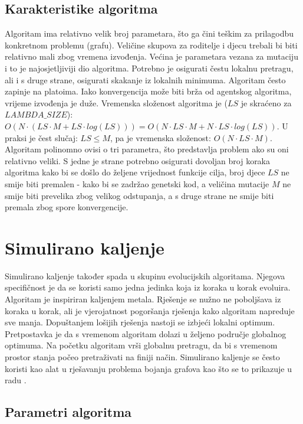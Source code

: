 \documentclass[times, utf8, diplomski, numeric]{fer}
\begin{document}
\subsection{Karakteristike algoritma}

Algoritam ima relativno velik broj parametara, što ga čini teškim za prilagodbu konkretnom problemu (grafu). Veličine skupova za roditelje i djecu trebali bi biti relativno mali zbog vremena izvođenja. Većina je parametara vezana za mutaciju i to je najosjetljiviji dio algoritma. Potrebno je osigurati čestu lokalnu pretragu, ali i s druge strane, osigurati skakanje iz lokalnih minimuma. Algoritam često zapinje na platoima. Iako konvergencija može biti brža od agentskog algoritma, vrijeme izvođenja je duže.
Vremenska složenost algoritma je ($LS$ je skraćeno za $LAMBDA\_SIZE$): $O(N\cdot(LS \cdot M + LS\cdot log(LS)))=O(N\cdot LS\cdot M + N\cdot LS \cdot log(LS))$. U praksi je čest slučaj: $LS\le M$, pa je vremenska složenost: $O(N\cdot LS \cdot M)$. Algoritam polinomno ovisi o tri parametra, što predstavlja problem ako su oni relativno veliki. S jedne je strane potrebno osigurati dovoljan broj koraka algoritma kako bi se došlo do željene vrijednost funkcije cilja, broj djece $LS$ ne smije biti premalen - kako bi se zadržao genetski kod, a veličina mutacije $M$ ne smije biti prevelika zbog velikog odstupanja, a s druge strane ne smije biti premala zbog spore konvergencije. 

\section{Simulirano kaljenje}

Simulirano kaljenje također spada u skupinu evolucijskih algoritama. Njegova specifičnost je da se koristi samo jedna jedinka koja iz koraka u korak evoluira. Algoritam je inspiriran kaljenjem metala. Rješenje se nužno ne poboljšava iz koraka u korak, ali je vjerojatnost pogoršanja rješenja kako algoritam napreduje sve manja. Dopuštanjem lošijih rješenja nastoji se izbjeći lokalni optimum. Pretpostavka je da s vremenom algoritam dolazi u željeno područje globalnog optimuma. Na početku algoritam vrši globalnu pretragu, da bi s vremenom prostor stanja počeo pretraživati na finiji način. Simulirano kaljenje se često koristi kao alat u rješavanju problema bojanja grafova kao što se to prikazuje u radu \cite{lit13}.

\subsection{Parametri algoritma}
\end{document}
